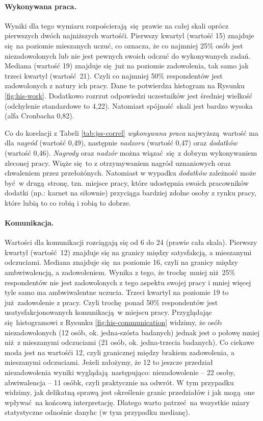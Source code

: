 \paragraph{Wykonywana praca.} Wyniki dla tego wymiaru rozpościerają się prawie na całej skali oprócz pierwszych dwóch najniższych wartośći. Pierwszy kwartyl (wartość 15) znajduje się na poziomie mieszanych uczuć, co oznacza, że co najmniej 25\% osób jest niezadowolonych lub nie jest pewnych swoich odczuć do wykonywanych zadań. Mediana (wartość 19) znajduje się już na poziomie zadowolenia, tak samo jak trzeci kwartyl (wartość 21). Czyli co najmniej 50\% respondentów jest zadowolonych z
natury ich pracy. Dane te potwierdza histogram na Rysunku \ref{fig:his-work}. Dodatkowo rozrzut odpowiedzi uczestników jest średniej wielkość (odchylenie standardowe to 4,22). Natomiast spójność skali jest bardzo wysoka (alfa Cronbacha 0,82).

Co do korelacji z Tabeli \ref{tab:jss-correl} \textit{wykonywana praca} najwyższą wartość ma dla \textit{nagród} (wartość 0,49), następnie \textit{nadzoru} (wartość 0,47) oraz \textit{dodatków} (wartość 0,46). \textit{Nagrody} oraz \textit{nadzór} można wiązać się z dobrym wykonywaniem zleconej pracy. Wiąże się to z otrzymywaniem nagród uznaniowych oraz chwaleniem przez przełożónych. Natomiast w wypadku \textit{dodatków} zależność może być w drugą stronę, tzn. miejsce pracy, które udostępnia swoich
pracowników dodatki (np.: karnet na siłownie) przyciąga bardziej zdolne osoby z rynku pracy, które lubią to co robią i robią to dobrze.

\paragraph{Komunikacja.} Wartości dla komunikacji rozciągają się od 6 do 24 (prawie cała skala). Pierwszy kwartyl (wartość 12) znajduje się na granicy między satysfakcją, a mieszanymi odczuciami. Mediana znajduje się na poziomie 16, czyli na granicy między ambwiwalencją, a zadowoleniem. Wynika z tego, że trochę mniej niż 25\% respondentów nie jest zadowolonych z tego aspektu swojej pracy i mniej więcej tyle samo ma ambwiwalentne uczucia. Trzeci kwartyl na poziomie 19 to
już zadowolenie z pracy. Czyli trochę ponad 50\% respondentów jest usatysfakcjonowanych komunikacją w miejscu pracy. Przyglądając się histogramowi z Rysunku \ref{fig:his-communication} widzimy, że osób niezadowolonych (12 osób, ok. jedna-szósta badanych) jednak jest o połowę mniej niż z mieszanymi odczuciami (21 osób, ok. jedna-trzecia badanych). Co ciekawe moda jest na wartośći 12, czyli granicznej między brakiem zadowolenia, a mieszanymi odczuciami. Jeżeli założymy, że 12 to jeszcze przedział
niezadowolenia wyniki wyglądają następująco: niezadowolenie -- 22 osoby, abwiwalencja -- 11 osóbk, czyli praktycznie na odwrót. W tym przypadku widzimy, jak delikatną sprawą jest określenie granic przedziałów i jak mogą one wpływać na końcową interpretację. Dlatego warto patrzeć na wszystkie miary statystyczne odnośnie danyhc (w tym przypadku medianę). 

